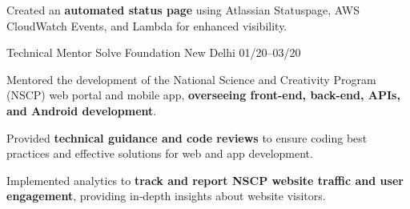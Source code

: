 \begin{cventries}
{\begin{cvitems}
        \item {Created an \textbf{automated status page} using Atlassian Statuspage, AWS CloudWatch Events, and Lambda for enhanced visibility.}
      \end{cvitems}
    }
    {}

  \cventry
    {Technical Mentor} %
    {Solve Foundation} %
    {New Delhi} %
    {01/20--03/20} %
    {
      \begin{cvitems} %
        \item {Mentored the development of the National Science and Creativity Program (NSCP) web portal and mobile app, \textbf{overseeing front-end, back-end, APIs, and Android development}.}
        \item {Provided \textbf{technical guidance and code reviews} to ensure coding best practices and effective solutions for web and app development.}
        \item {Implemented analytics to \textbf{track and report NSCP website traffic and user engagement}, providing in‑depth insights about website visitors.}
      \end{cvitems}
    }
    {}


\end{cventries}
